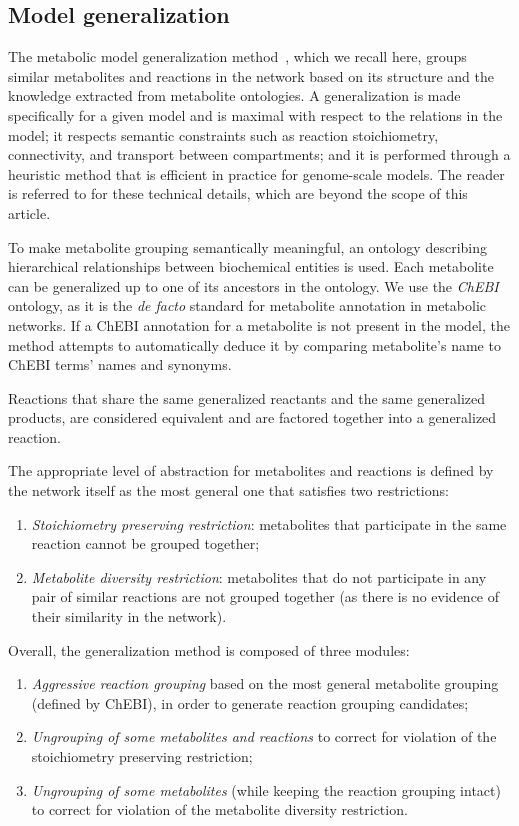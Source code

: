 \documentclass{bmcart}
\begin{document}
\subsection*{Model generalization}
The metabolic model generalization method~\cite{Zhukova2014}, which we recall here, groups similar metabolites and reactions in the network based on its structure and the knowledge extracted from metabolite ontologies. 
A generalization is made specifically for a given model and is maximal with respect to the
relations in the model; it respects semantic constraints such as reaction stoichiometry,
connectivity, and transport between compartments; and it is performed through a heuristic
method that is efficient in practice for genome-scale models. The reader is referred to \cite{Zhukova2014} for these technical details, which are beyond the scope of this article.

To make metabolite grouping semantically meaningful, an ontology describing hierarchical relationships between biochemical entities is used. Each metabolite can be generalized up to one of its ancestors in the ontology. We use the \textit{ChEBI} ontology, as it is the \textit{de facto} standard for metabolite annotation in metabolic networks. If a ChEBI annotation for a metabolite is not present in the model, the method attempts to automatically deduce it by comparing metabolite's name to ChEBI terms' names and synonyms. 

Reactions that share the same generalized reactants and the same generalized products, are considered equivalent and are factored together into a generalized reaction. 

The appropriate level of abstraction for metabolites and reactions is defined by the network itself as the most general one that satisfies two restrictions: 
\begin{enumerate}
 \item \emph{Stoichiometry preserving restriction}: metabolites that participate in the same reaction cannot be grouped together;
 \item \emph{Metabolite diversity restriction}: metabolites that do not participate in any pair of similar reactions are not grouped together (as there is no evidence of their similarity in the network).
\end{enumerate}

Overall, the generalization method is composed of three modules: 
\begin{enumerate}
\item \emph{Aggressive reaction grouping} based on the most general metabolite grouping (defined by ChEBI), in order to generate reaction grouping candidates;
\item \emph{Ungrouping of some metabolites and reactions} to correct for violation of the stoichiometry preserving restriction;
\item \emph{Ungrouping of some metabolites} (while keeping the reaction grouping intact) to correct for violation of the metabolite diversity restriction.
\end{enumerate} 
\end{document}
